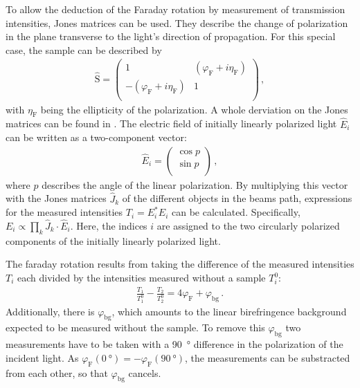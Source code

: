 	To allow the deduction of the Faraday rotation by measurement of transmission intensities, Jones matrices can be used.
	They describe the change of polarization in the plane transverse to the light's direction of propagation.
	For this special case, the sample can be described by
	\begin{align*}
		\hat{\text{S}} = \left( \begin{array}{rr}
		1 & (\varphi_\text{F} + i\eta_\text{F}) \\
		-(\varphi_\text{F} + i\eta_\text{F}) & 1 \\
	\end{array}\right) \,,
	\end{align*}
  with $\eta_\text{F}$ being the ellipticity of the polarization.
  A whole derviation on the Jones matrices can be found in \cite{arora}.
	The electric field of initially linearly polarized light $\hat{E}_i$ can be written as a two-component vector:
	\begin{align*}
		\hat{E}_i = \left( \begin{array}{r}
					\cos{p} \\
					\sin{p} \\
				\end{array}\right) \,,
	\end{align*}
	where $p$ describes the angle of the linear polarization.
	By multiplying this vector with the Jones matrices $\hat{J}_k$ of the different objects in the beams path, expressions for the measured intensities $T_i = E_i^* E_i$ can be calculated.
  Specifically, $E_i \propto \prod_k \hat{J}_k \cdot \hat{E}_i$.
  Here, the indices $i$ are assigned to the two circularly polarized components of the initially linearly polarized light.

  The faraday rotation results from taking the difference of the measured intensities $T_i$ each divided by the intensities measured without a sample $T_i^0$:
	\begin{align*}
		\frac{T_1}{T_1^0} - \frac{T_2}{T_2^0} = 4 \varphi_\text{F} + \varphi_\text{bg} \,.
	\end{align*}
	Additionally, there is $\varphi_\text{bg}$, which amounts to the linear birefringence background expected to be measured without the sample.
  To remove this $\varphi_\text{bg}$ two measurements have to be taken with a \SI{90}{\degree} difference in the polarization of the incident light.
  As $\varphi_\text{F}(\SI{0}{\degree}) = -\varphi_\text{F}(\SI{90}{\degree})$, the measurements can be substracted from each other, so that $\varphi_\text{bg}$ cancels.
